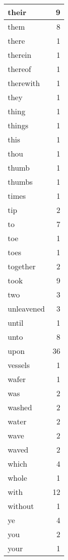 \begin{center}
\begin{longtable}{l|r}
their & 9 \\ \hline
them & 8 \\ \hline
there & 1 \\ \hline
therein & 1 \\ \hline
thereof & 1 \\ \hline
therewith & 1 \\ \hline
they & 1 \\ \hline
thing & 1 \\ \hline
things & 1 \\ \hline
this & 1 \\ \hline
thou & 1 \\ \hline
thumb & 1 \\ \hline
thumbs & 1 \\ \hline
times & 1 \\ \hline
tip & 2 \\ \hline
to & 7 \\ \hline
toe & 1 \\ \hline
toes & 1 \\ \hline
together & 2 \\ \hline
took & 9 \\ \hline
two & 3 \\ \hline
unleavened & 3 \\ \hline
until & 1 \\ \hline
unto & 8 \\ \hline
upon & 36 \\ \hline
vessels & 1 \\ \hline
wafer & 1 \\ \hline
was & 2 \\ \hline
washed & 2 \\ \hline
water & 2 \\ \hline
wave & 2 \\ \hline
waved & 2 \\ \hline
which & 4 \\ \hline
whole & 1 \\ \hline
with & 12 \\ \hline
without & 1 \\ \hline
ye & 4 \\ \hline
you & 2 \\ \hline
your & 1 \\ \hline
\end{longtable}
\end{center}



\normalsize




